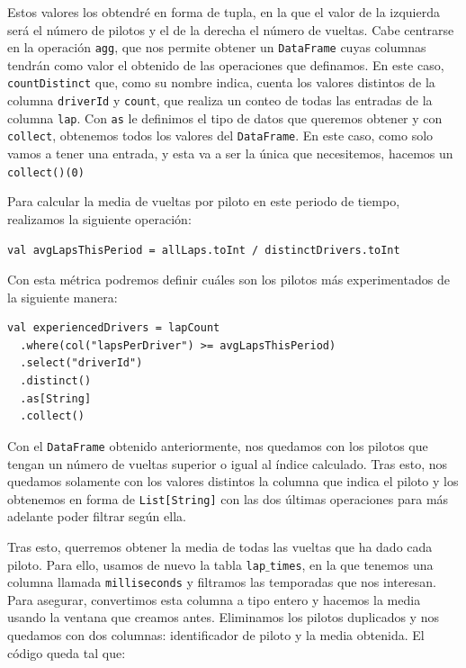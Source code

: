 \documentclass[12pt,twoside,titlepage]{report}
\begin{document}
Estos valores los obtendré en forma de tupla, en la que el valor de la izquierda será el número de pilotos y el de la derecha el número de vueltas. Cabe centrarse en la operación \texttt{agg}, que nos permite obtener un \texttt{DataFrame} cuyas columnas tendrán como valor el obtenido de las operaciones que definamos. En este caso, \texttt{countDistinct} que, como su nombre indica, cuenta los valores distintos de la columna \texttt{driverId} y \texttt{count}, que realiza un conteo de todas las entradas de la columna \texttt{lap}. Con \texttt{as} le definimos el tipo de datos que queremos obtener y con \texttt{collect}, obtenemos todos los valores del \texttt{DataFrame}. En este caso, como solo vamos a tener una entrada, y esta va a ser la única que necesitemos, hacemos un \texttt{collect()(0)}

Para calcular la media de vueltas por piloto en este periodo de tiempo, realizamos la siguiente operación:

\begin{lstlisting}
val avgLapsThisPeriod = allLaps.toInt / distinctDrivers.toInt
\end{lstlisting}

Con esta métrica podremos definir cuáles son los pilotos más experimentados de la siguiente manera:

\begin{lstlisting}
val experiencedDrivers = lapCount
  .where(col("lapsPerDriver") >= avgLapsThisPeriod)
  .select("driverId")
  .distinct()
  .as[String]
  .collect()
\end{lstlisting}

Con el \texttt{DataFrame} obtenido anteriormente, nos quedamos con los pilotos que tengan un número de vueltas superior o igual al índice calculado. Tras esto, nos quedamos solamente con los valores distintos la columna que indica el piloto y los obtenemos en forma de \texttt{List[String]} con las dos últimas operaciones para más adelante poder filtrar según ella.

Tras esto, querremos obtener la media de todas las vueltas que ha dado cada piloto. Para ello, usamos de nuevo la tabla \texttt{lap$\_$times}, en la que tenemos una columna llamada \texttt{milliseconds} y filtramos las temporadas que nos interesan. Para asegurar, convertimos esta columna a tipo entero y hacemos la media usando la ventana que creamos antes. Eliminamos los pilotos duplicados y nos quedamos con dos columnas: identificador de piloto y la media obtenida. El código queda tal que:
\end{document}
